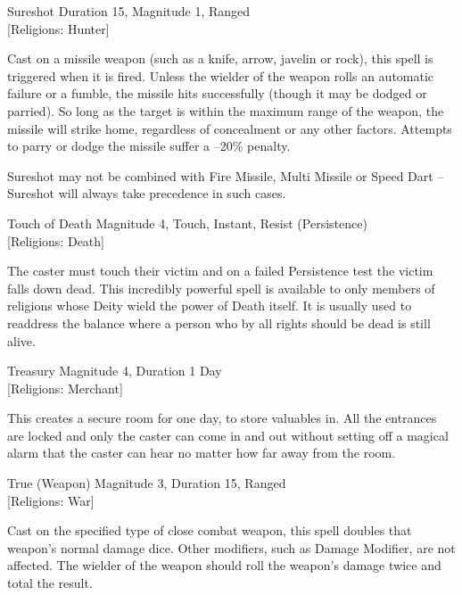 \begin{samepage}
\begin{rpg-spell}
{Sureshot}
{Duration 15, Magnitude 1, Ranged\\{[Religions: Hunter]}}

Cast on a missile weapon (such as a knife, arrow, javelin or rock), this spell is triggered when it is fired. Unless the wielder of the weapon rolls an automatic failure or a fumble, the missile hits successfully (though it may be dodged or parried). So long as the target is within the maximum range of the weapon, the missile will strike home, regardless of concealment or any other factors. Attempts to parry or dodge the missile suffer a –20\% penalty. 

Sureshot may not be combined with Fire Missile, Multi Missile or Speed Dart – Sureshot will always take precedence in such cases. 
\end{rpg-spell}
\end{samepage}

\begin{samepage}
\begin{rpg-spell}
{Touch of Death}
{Magnitude 4, Touch, Instant, Resist (Persistence)\\{[Religions: Death]}}

The caster must touch their victim and on a failed Persistence test the victim falls down dead. This incredibly powerful spell is available to only members of religions whose Deity wield the power of Death itself. It is usually used to readdress the balance where a person who by all rights should be dead is still alive. 
\end{rpg-spell}
\end{samepage}

\begin{samepage}
\begin{rpg-spell}
{Treasury}
{Magnitude 4, Duration 1 Day\\{[Religions: Merchant]}}

This creates a secure room for one day, to store valuables in. All the entrances are locked and only the caster can come in and out without setting off a magical alarm that the caster can hear no matter how far away from the room.
\end{rpg-spell}
\end{samepage}

\begin{samepage}
\begin{rpg-spell}
{True (Weapon)}
{Magnitude 3, Duration 15, Ranged\\{[Religions: War]}}

Cast on the specified type of close combat weapon, this spell doubles that weapon’s normal damage dice. Other modifiers, such as Damage Modifier, are not affected. The wielder of the weapon should roll the weapon’s damage twice and total the result.
\end{rpg-spell}
\end{samepage}

